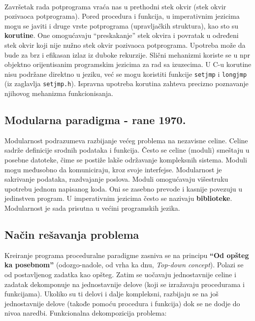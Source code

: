 \documentclass[../main.tex]{subfiles}
\begin{document}
\\
Završetak rada potprograma vraća nas u prethodni stek okvir (stek okvir pozivaoca potprograma). Pored procedura i funkcija, u imperativnim jezicima mogu se javiti i druge vrste potprograma (upravljačkih struktura), kao sto su {\bf korutine}. One omogućavaju ``preskakanje'' stek okvira i povratak u određeni stek okvir koji nije nužno stek okvir pozivaoca potprograma. Upotreba može da bude za brz i efikasan izlaz iz duboke rekurzije. Slični mehanizmi koriste se u npr objektno orijentisanim programskim jezicima za rad sa izuzecima. U C-u korutine nisu podržane direktno u jeziku, već se mogu koristiti funkcije \texttt{setjmp} i \texttt{longjmp} (iz zaglavlja \texttt{setjmp.h}). Ispravna upotreba korutina zahteva precizno poznavanje njihovog mehanizma funkcionisanja.

\pagebreak
\subsection{Modularna paradigma - rane 1970.}

Modularnost podrazumeva razbijanje većeg problema na nezavisne celine. Celine sadrže definicije srodnih podataka i funkcija. Često se celine (moduli) smeštaju u posebne datoteke, čime se postiže lakše održavanje kompleksnih sistema. Moduli mogu međusobno da komuniciraju, kroz svoje interfejse. Modularnost je sakrivanje podataka, razdvajanje poslova. Moduli omogućavaju višestruku upotrebu jednom napisanog koda. Oni se zasebno prevode i kasnije povezuju u jedinstven program. U imperativnim jezicima često se nazivaju {\bf biblioteke}. Modularnost je sada prisutna u većini programskih jezika.

\subsection{Način rešavanja problema}

Kreiranje programa proceduralne paradigme zasniva se na principu {\bf ``Od opšteg ka posebnom''} (odozgo-nadole, od vrha ka dnu, {\it Top-down concept}). Polazi se od postavljenog zadatka kao opšteg. Zatim se uočavaju jednostavnije celine i zadatak dekomponuje na jednostavnije delove (koji se izražavaju procedurama i funkcijama). Ukoliko su ti delovi i dalje kompleksni, razbijaju se na još jednostavnije delove (takođe pomoću procedura i funkcija) dok se ne dodje do nivoa naredbi. Funkcionalna dekompozicija problema:
\end{document}
